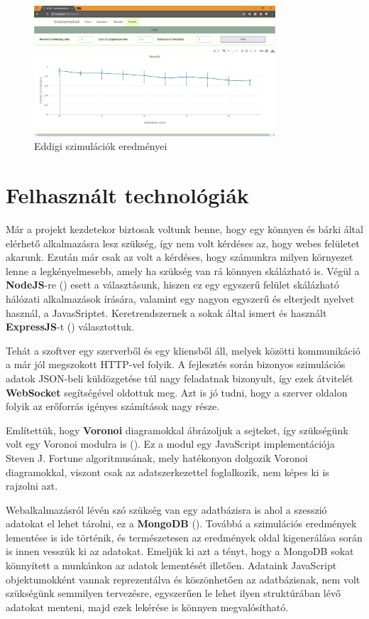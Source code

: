 \begin{figure}[ht!]
	\centering
	\includegraphics[width=90mm]{images/SimulationResults}
	\vspace*{1mm}
	\caption{Eddigi szimulációk eredményei}
	\label{fig:SimulationResults}
\end{figure}


\section{Felhasznált technológiák}

Már a projekt kezdetekor biztosak voltunk benne, hogy egy könnyen és bárki által elérhető alkalmazásra lesz szükség, így nem volt kérdéses az, hogy webes felületet akarunk. Ezután már csak az volt a kérdéses, hogy számunkra milyen környezet lenne a legkényelmesebb, amely ha szükség van rá könnyen skálázható is. Végül a \textbf{NodeJS}-re (\cite{soft:node}) esett a választásunk, hiszen ez egy egyszerű felület skálázható hálózati alkalmazások írására, valamint egy nagyon egyszerű és elterjedt nyelvet használ, a JavasSriptet. Keretrendszernek a sokak által ismert és használt \textbf{ExpressJS}-t (\cite{soft:express}) választottuk.

Tehát a szoftver egy szerverből és egy kliensből áll, melyek közötti kommunikáció a már jól megszokott HTTP-vel folyik. A fejlesztés során bizonyos szimulációs adatok JSON-beli küldözgetése túl nagy feladatnak bizonyult, így ezek átvitelét \textbf{WebSocket} segítségével oldottuk meg. Azt is jó tudni, hogy a szerver oldalon folyik az erőforrás igényes számítások nagy része.

Említettük, hogy \textbf{Voronoi} diagramokkal ábrázoljuk a sejteket, így szükségünk volt egy Voronoi modulra is (\cite{soft:voronoiModule}). Ez a modul egy JavaScript implementációja Steven J. Fortune algoritmusának, mely hatékonyon dolgozik Voronoi diagramokkal, viszont csak az adatszerkezettel foglalkozik, nem képes ki is rajzolni azt.

Webalkalmazásról lévén szó szükség van egy adatbázisra is ahol a szesszió adatokat el lehet tárolni, ez a \textbf{MongoDB} (\cite{soft:mongodb}). Továbbá a szimulációs eredmények lementése is ide történik, és természetesen az eredmények oldal kigenerálása során is innen vesszük ki az adatokat. Emeljük ki azt a tényt, hogy a MongoDB sokat könnyített a munkánkon az adatok lementését illetően. Adataink JavaScript objektumokként vannak reprezentálva és köszönhetően az adatbázisnak, nem volt szükségünk semmilyen tervezésre, egyszerűen le lehet ilyen struktúrában lévő adatokat menteni, majd ezek lekérése is könnyen megvalósítható.


